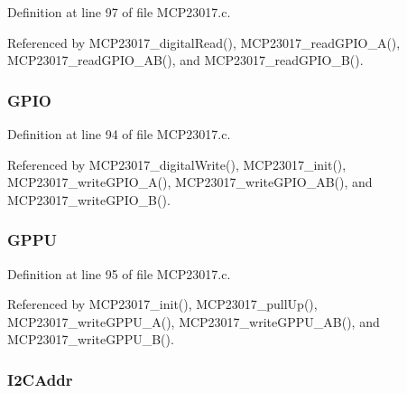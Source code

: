 Definition at line 97 of file M\-C\-P23017.\-c.



Referenced by M\-C\-P23017\-\_\-digital\-Read(), M\-C\-P23017\-\_\-read\-G\-P\-I\-O\-\_\-\-A(), M\-C\-P23017\-\_\-read\-G\-P\-I\-O\-\_\-\-A\-B(), and M\-C\-P23017\-\_\-read\-G\-P\-I\-O\-\_\-\-B().

\hypertarget{structtag_m_c_p23017_a8bf9a3a47fd6ef498c3f5506bad2fbdc}{
\subsubsection[{G\-P\-I\-O}]{ G\-P\-I\-O}}\label{structtag_m_c_p23017_a8bf9a3a47fd6ef498c3f5506bad2fbdc}


Definition at line 94 of file M\-C\-P23017.\-c.



Referenced by M\-C\-P23017\-\_\-digital\-Write(), M\-C\-P23017\-\_\-init(), M\-C\-P23017\-\_\-write\-G\-P\-I\-O\-\_\-\-A(), M\-C\-P23017\-\_\-write\-G\-P\-I\-O\-\_\-\-A\-B(), and M\-C\-P23017\-\_\-write\-G\-P\-I\-O\-\_\-\-B().

\hypertarget{structtag_m_c_p23017_a37c518ef28e3e0bcd2ab58ebd39ed543}{
\subsubsection[{G\-P\-P\-U}]{ G\-P\-P\-U}}\label{structtag_m_c_p23017_a37c518ef28e3e0bcd2ab58ebd39ed543}


Definition at line 95 of file M\-C\-P23017.\-c.



Referenced by M\-C\-P23017\-\_\-init(), M\-C\-P23017\-\_\-pull\-Up(), M\-C\-P23017\-\_\-write\-G\-P\-P\-U\-\_\-\-A(), M\-C\-P23017\-\_\-write\-G\-P\-P\-U\-\_\-\-A\-B(), and M\-C\-P23017\-\_\-write\-G\-P\-P\-U\-\_\-\-B().

\hypertarget{structtag_m_c_p23017_a525e929bfd993f97bf03022b3d01e334}{
\subsubsection[{I2\-C\-Addr}]{ I2\-C\-Addr}}\label{structtag_m_c_p23017_a525e929bfd993f97bf03022b3d01e334}



